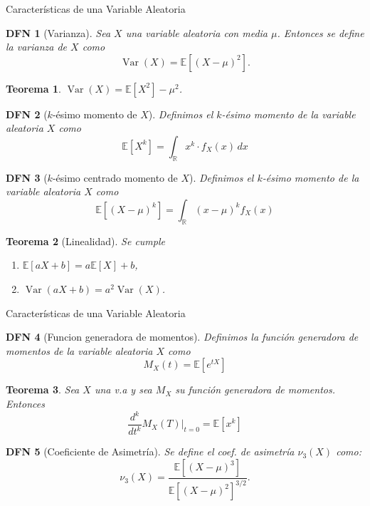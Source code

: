 \documentclass[a4paper]{article}
\newtheorem{definition}{DFN}
\theoremstyle{mytheoremstyle}
\newtheorem{theorem}{Teorema}
\newcommand{\R}{\mathbb{R}}
\newcommand{\E}{\mathbb{E}}
\newcommand{\1}{\mathds{1}}
\DeclareMathOperator{\Var}{Var}
\begin{document}
\begin{multicols*}{3}
\begin{roundbox}{Características de una Variable Aleatoria}
\begin{definition}[Varianza] 
    Sea $X$ una variable aleatoria con media $\mu$. Entonces se define la varianza de $X$ como 
    \[
        \Var(X) = \E[(X- \mu)^{2}].  
    \]
\end{definition}

\begin{theorem}
    $\Var(X) = \E[X^{2}] - \mu^{2}$.
\end{theorem}

\begin{definition}[$k$-ésimo momento de $X$] 
    Definimos el $k$-ésimo momento de la variable aleatoria $X$ como 
    \[
        \E\left[X^k\right] = \int_{\R} x^k \cdot f_X(x) \, dx 
    \]
\end{definition}

\begin{definition}[$k$-ésimo centrado momento de $X$] 
    Definimos el $k$-ésimo momento de la variable aleatoria $X$ como 
    \[
        \E[(X-\mu)^k] = \int_{\R} (x-\mu)^k f_X(x)  
    \]
\end{definition}

\begin{theorem}[Linealidad]
    Se cumple
    \begin{enumerate}
        \item $\E[aX+b]=a\E[X]+b$,
        \item $\Var(aX+b)=a^2\Var(X)$.
    \end{enumerate}
\end{theorem}
\end{roundbox}

\columnbreak

\begin{roundbox}{Características de una Variable Aleatoria}
    \begin{definition}[Funcion generadora de momentos] 
        Definimos la función generadora de momentos de la variable aleatoria $X$ como
        \[
            M_X(t) = \E\left[ e^{tX} \right]  
        \] 
    \end{definition}
    \begin{theorem}
        Sea $X$ una v.a y sea $M_X$ su función generadora de momentos. Entonces 
        \[
            \frac{d^k}{dt^k} M_X(T) \bigg\lvert_{t=0} = \E\left[x^k\right]  
        \]
    \end{theorem}

    \begin{definition}[Coeficiente de Asimetría] 
        Se define el coef. de asimetría $\nu_3(X)$ como:
        \[
            \nu_3(X) = \frac{\E[(X - \mu)^{3}]}{\E[(X-\mu)^2]^{3/2}}.
        \] 
    \end{definition}


\end{roundbox}
\end{multicols*}
\end{document}

